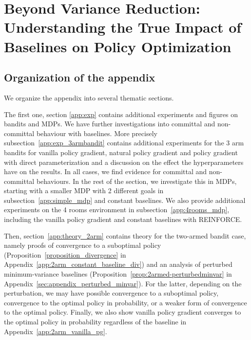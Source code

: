 \chapter{Beyond Variance Reduction: Understanding the True Impact of Baselines on Policy Optimization}


\section*{Organization of the appendix}

We organize the appendix into several thematic sections. 

The first one, section \ref{app:exp} contains additional experiments and figures on bandits and MDPs. 
We have further investigations into committal and non-committal behaviour with baselines. 
More precisely subsection~\ref{app:exp_3armbandit} contains additional experiments for the 3 arm bandits for vanilla policy gradient, natural policy gradient and policy gradient with direct parameterization and a discussion on the effect the hyperparameters have on the results. In all cases, we find evidence for committal and non-committal behaviours. 
In the rest of the section, we investigate this in MDPs, starting with a smaller MDP with 2 different goals in subsection~\ref{app:simple_mdp} and constant baselines. We also provide additional experiments on the 4 rooms environment in subsection~\ref{app:4rooms_mdp}, including the vanilla policy gradient and constant baselines with REINFORCE. 

Then, section~\ref{app:theory_2arm} contains theory for the two-armed bandit case, namely proofs of convergence to a suboptimal policy (Proposition~\ref{proposition_divergence} in Appendix~\ref{app:2arm_constant_baseline_div}) and an analysis of perturbed minimum-variance baselines (Proposition~\ref{prop:2armed-perturbedminvar} in Appendix~\ref{sec:appendix_perturbed_minvar}). For the latter, depending on the perturbation, we may have possible convergence to a suboptimal policy, convergence to the optimal policy in probability, or a weaker form of convergence to the optimal policy. Finally, we also show vanilla policy gradient converges to the optimal policy in probability regardless of the baseline in Appendix~\ref{app:2arm_vanilla_pg}. 

